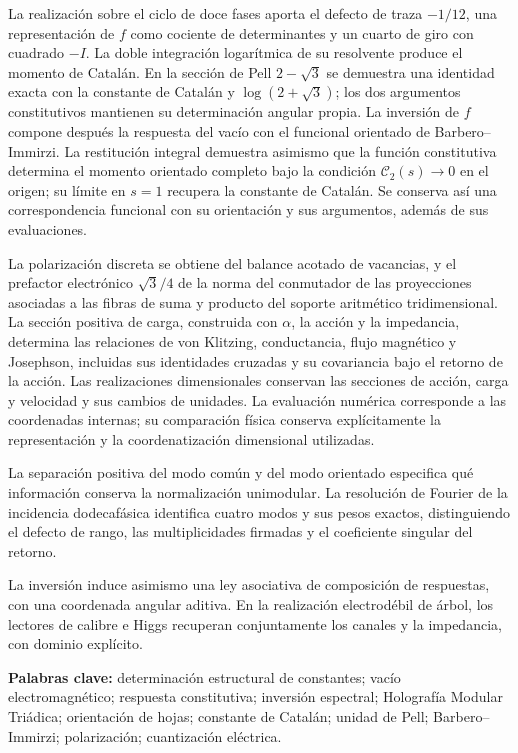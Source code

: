 La realización sobre el ciclo de doce fases aporta el defecto de traza
$-1/12$, una representación de $f$ como cociente de determinantes y un cuarto de giro
con cuadrado $-I$. La doble integración logarítmica de su resolvente
produce el momento de Catalán. En la sección de Pell $2-\sqrt3$ se
demuestra una identidad exacta con la constante de Catalán y
$\log(2+\sqrt3)$; los dos argumentos constitutivos mantienen su
determinación angular propia. La inversión de $f$ compone después la
respuesta del vacío con el funcional orientado de Barbero--Immirzi.
La restitución integral demuestra asimismo que la función constitutiva
determina el momento orientado completo bajo la condición
$\mathcal C_2(s)\to0$ en el origen; su límite en $s=1$ recupera
la constante de Catalán. Se conserva así una correspondencia funcional
con su orientación y sus argumentos, además de sus evaluaciones.

La polarización discreta se obtiene del balance acotado de vacancias,
y el prefactor electrónico $\sqrt3/4$ de la norma del conmutador de
las proyecciones asociadas a las fibras de suma y producto del soporte
aritmético tridimensional. La sección
positiva de carga, construida con $\alpha$, la acción y la impedancia,
determina las relaciones de von Klitzing, conductancia, flujo magnético
y Josephson, incluidas sus identidades cruzadas y su covariancia bajo
el retorno de la acción. Las realizaciones dimensionales conservan las
secciones de acción, carga y velocidad y sus cambios de unidades. La
evaluación numérica corresponde a las coordenadas internas;
su comparación física conserva explícitamente la representación y la
coordenatización dimensional utilizadas.

La separación positiva del modo común y del modo orientado especifica
qué información conserva la normalización unimodular. La resolución
de Fourier de la incidencia dodecafásica identifica cuatro modos y
sus pesos exactos, distinguiendo el defecto de rango, las multiplicidades
firmadas y el coeficiente singular del retorno.

La inversión induce asimismo una ley asociativa de composición de
respuestas, con una coordenada angular aditiva. En la realización
electrodébil de árbol, los lectores de calibre e Higgs recuperan
conjuntamente los canales y la impedancia, con dominio explícito.

\smallskip
\noindent\textbf{Palabras clave:} determinación estructural de constantes;
vacío electromagnético; respuesta constitutiva; inversión espectral;
Holografía Modular Triádica; orientación de hojas; constante de Catalán;
unidad de Pell; Barbero--Immirzi; polarización; cuantización eléctrica.
\par\endgroup
